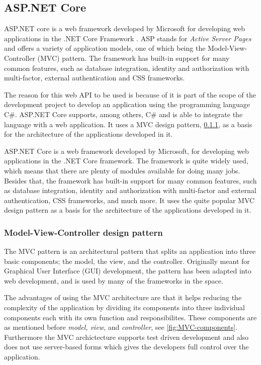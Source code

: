 \documentclass[../../master.tex]{subfiles}
\begin{document}
\subsection{ASP.NET Core} \label{sec:aspnetcore}

ASP.NET core is a web framework developed by Microsoft for developing web applications in the .NET Core Framework \cite{aspnetcore2}.
ASP stands for \textit{Active Server Pages} and offers a variety of application models, one of which being the Model-View-Controller (MVC) pattern.
The framework has built-in support for many common features, such as database integration, identity and authorization with multi-factor, external authentication and CSS frameworks.

The reason for this web API to be used is because of it is part of the scope of the development project to develop an application using the programming language C\#.
ASP.NET Core supports, among others, C\# and is able to integrate the language with a web application.
It uses a MVC design pattern, \cref{sec:mvc}, as a basis for the architecture of the applications developed in it.

ASP.NET Core is a web framework developed by Microsoft, for developing web applications in the .NET Core framework.
The framework is quite widely used, which means that there are plenty of modules available for doing many jobs. Besides that, the framework has built-in support for many common features, such as database integration, identity and authorization with multi-factor and external authentication, CSS frameworks, and much more.
It uses the quite popular MVC design pattern as a basis for the architecture of the applications developed in it.

\subsubsection{Model-View-Controller design pattern}\label{sec:mvc}
The MVC pattern is an architectural pattern that splits an application into three basic components; the model, the view, and the controller.
Originally meant for Graphical User Interface (GUI) development, the pattern has been adapted into web development, and is used by many of the frameworks in the space. \cite{gangoffour}

The advantages of using the MVC architecture are that it helps reducing the complexity of the application by dividing its components into three individual components each with its own function and responsibilites.
These components are as mentioned before \textit{model, view}, and \textit{controller}, see \cref{fig:MVC-components}.
Furthermore the MVC archictecture supports test driven development and also does not use server-based forms which gives the developers full control over the application. \cite{mvcarticle}
\end{document}
